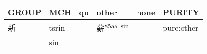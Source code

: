 \documentclass[14pt,a4paper]{scrartcl}
\begin{document}
\begin{longtable}[c]{@{}llllll@{}}
\toprule
\begin{minipage}[b]{0.14\columnwidth}\raggedright\strut
GROUP
\strut\end{minipage} &
\begin{minipage}[b]{0.14\columnwidth}\raggedright\strut
MCH
\strut\end{minipage} &
\begin{minipage}[b]{0.14\columnwidth}\raggedright\strut
qu
\strut\end{minipage} &
\begin{minipage}[b]{0.14\columnwidth}\raggedright\strut
other
\strut\end{minipage} &
\begin{minipage}[b]{0.14\columnwidth}\raggedright\strut
none
\strut\end{minipage} &
\begin{minipage}[b]{0.14\columnwidth}\raggedright\strut
PURITY
\strut\end{minipage}\tabularnewline
\midrule
\endhead
\begin{minipage}[t]{0.14\columnwidth}\raggedright\strut
新
\strut\end{minipage} &
\begin{minipage}[t]{0.14\columnwidth}\raggedright\strut
tsrin
\strut\end{minipage} &
\begin{minipage}[t]{0.14\columnwidth}\raggedright\strut
\strut\end{minipage} &
\begin{minipage}[t]{0.14\columnwidth}\raggedright\strut
薪\textsuperscript{85aa~sin}
\strut\end{minipage} &
\begin{minipage}[t]{0.14\columnwidth}\raggedright\strut
\strut\end{minipage} &
\begin{minipage}[t]{0.14\columnwidth}\raggedright\strut
pure:other
\strut\end{minipage}\tabularnewline
\begin{minipage}[t]{0.14\columnwidth}\raggedright\strut
𣐽
\strut\end{minipage} &
\begin{minipage}[t]{0.14\columnwidth}\raggedright\strut
sin
\strut\end{minipage} &
\begin{minipage}[t]{0.14\columnwidth}\raggedright\strut
\strut\end{minipage} &

\end{longtable}
\end{document}

